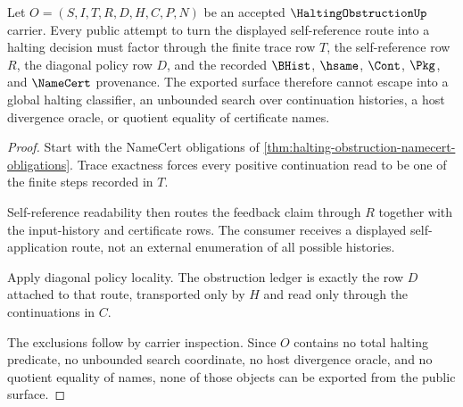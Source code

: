 \begin{theorem}
\label{thm:halting-obstruction-diagonal-nonescape}
Let $O=(S,I,T,R,D,H,C,P,N)$ be an accepted $\HaltingObstructionUp$ carrier. Every public attempt to turn the displayed self-reference route into a halting decision must factor through the finite trace row $T$, the self-reference row $R$, the diagonal policy row $D$, and the recorded $\BHist$, $\hsame$, $\Cont$, $\Pkg$, and $\NameCert$ provenance. The exported surface therefore cannot escape into a global halting classifier, an unbounded search over continuation histories, a host divergence oracle, or quotient equality of certificate names.
\end{theorem}
\begin{proof}
Start with the NameCert obligations of \autoref{thm:halting-obstruction-namecert-obligations}. Trace exactness forces every positive continuation read to be one of the finite steps recorded in $T$.

Self-reference readability then routes the feedback claim through $R$ together with the input-history and certificate rows. The consumer receives a displayed self-application route, not an external enumeration of all possible histories.

Apply diagonal policy locality. The obstruction ledger is exactly the row $D$ attached to that route, transported only by $H$ and read only through the continuations in $C$.

The exclusions follow by carrier inspection. Since $O$ contains no total halting predicate, no unbounded search coordinate, no host divergence oracle, and no quotient equality of names, none of those objects can be exported from the public surface.
\end{proof}


